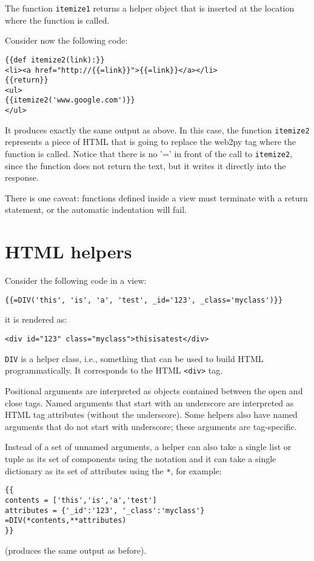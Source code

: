 \documentclass[justified,sixbynine,notoc]{tufte-book}
\def\ft{\small\tt}
\def\inxx#1{\index{#1}}
\begin{document}
\begin{fullwidth}
The function {\ft itemize1} returns a helper object that is inserted at the location where the function is called.

Consider now the following code:
\begin{lstlisting}[keywords={}]
{{def itemize2(link):}}
<li><a href="http://{{=link}}">{{=link}}</a></li>
{{return}}
<ul>
{{itemize2('www.google.com')}}
</ul>
\end{lstlisting}

It produces exactly the same output as above. In this case, the function {\ft itemize2} represents a piece of HTML that is going to replace the web2py tag where the function is called. Notice that there is no '=' in front of the call to {\ft itemize2}, since the function does not return the text, but it writes it directly into the response.

There is one caveat: functions defined inside a view must terminate with a return statement, or the automatic indentation will fail.

\goodbreak\section{HTML helpers}

\inxx{helpers}

Consider the following code in a view:
\begin{lstlisting}[keywords={}]
{{=DIV('this', 'is', 'a', 'test', _id='123', _class='myclass')}}
\end{lstlisting}
\noindent it is rendered as:
\begin{lstlisting}[keywords={}]
<div id="123" class="myclass">thisisatest</div>
\end{lstlisting}
{\ft DIV} is a helper class, i.e., something that can be used to build HTML programmatically. It corresponds to the HTML {\ft <div>} tag.

Positional arguments are interpreted as objects contained between the open and close tags. Named arguments that start with an underscore are interpreted as HTML tag attributes (without the underscore). Some helpers also have named arguments that do not start with underscore; these arguments are tag-specific.

Instead of a set of unnamed arguments, a helper can also take a single list or tuple as its set of components using the {\ft *} notation and it can take a single dictionary as its set of attributes using the {\ft **}, for example:
\begin{lstlisting}[keywords={}]
{{
contents = ['this','is','a','test']
attributes = {'_id':'123', '_class':'myclass'}
=DIV(*contents,**attributes)
}}
\end{lstlisting}
(produces the same output as before).


\end{fullwidth}
\end{document}
